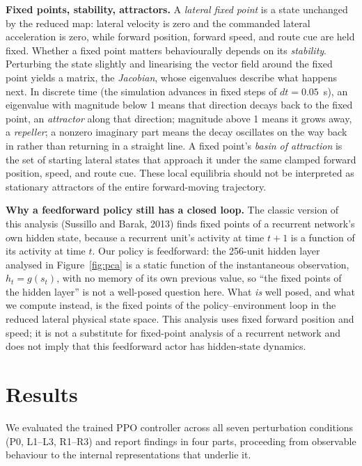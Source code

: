 \documentclass{article}
\begin{document}
\textbf{Fixed points, stability, attractors.}
A \emph{lateral fixed point} is a state unchanged by the reduced map:
lateral velocity is zero and the commanded lateral acceleration is zero,
while forward position, forward speed, and route cue are held fixed.
Whether a fixed point matters behaviourally depends on its
\emph{stability}. Perturbing the state slightly and linearising the
vector field around the fixed point yields a matrix, the \emph{Jacobian},
whose eigenvalues describe what happens next. In discrete time (the
simulation advances in fixed steps of $dt=0.05$~s), an eigenvalue with
magnitude below 1 means that direction decays back to the fixed point, an
\emph{attractor} along that direction; magnitude above 1 means it grows
away, a \emph{repeller}; a nonzero imaginary part means the decay
oscillates on the way back in rather than returning in a straight line. A
fixed point's \emph{basin of attraction} is the set of starting lateral
states that approach it under the same clamped forward position, speed,
and route cue. These local equilibria should not be interpreted as
stationary attractors of the entire forward-moving trajectory.

\textbf{Why a feedforward policy still has a closed loop.}
The classic version of this analysis (Sussillo and Barak, 2013) finds
fixed points of a recurrent network's own hidden state, because a
recurrent unit's activity at time $t+1$ is a function of its activity at
time $t$. Our policy is feedforward: the 256-unit hidden layer analysed
in Figure~\ref{fig:pca} is a static function of the instantaneous
observation, $h_t = g(s_t)$, with no memory of its own previous value, so
``the fixed points of the hidden layer'' is not a well-posed question
here. What \emph{is} well posed, and what we compute instead, is the
fixed points of the policy--environment loop in the reduced lateral
physical state space. This analysis uses fixed forward position and speed;
it is not a substitute for fixed-point analysis of a recurrent network and
does not imply that this feedforward actor has hidden-state dynamics.

\section{Results}

We evaluated the trained PPO controller across all seven perturbation
conditions (P0, L1--L3, R1--R3) and report findings in four parts,
proceeding from observable behaviour to the internal representations that
underlie it.
\end{document}
